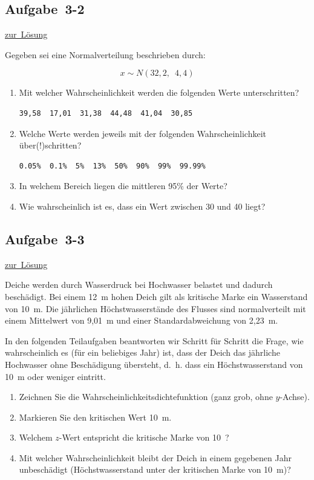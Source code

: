 \documentclass[
  11pt,
  ngerman,
  a4paper,
]{report}
\providecommand{\tightlist}{%
  \setlength{\itemsep}{0pt}\setlength{\parskip}{0pt}}
\begin{document}
\hypertarget{aufgabe-3-2}{%
\subsection{Aufgabe~3-2}\label{aufgabe-3-2}}

\protect\hyperlink{loesung-3-2}{zur~Lösung}

Gegeben sei eine Normalverteilung beschrieben durch:

\[x \sim N(32{,}2,\enspace4{,}4)\]

\begin{enumerate}
\def\labelenumi{\alph{enumi})}
\item
  Mit welcher Wahrscheinlichkeit werden die folgenden Werte unterschritten?

\begin{verbatim}
39,58  17,01  31,38  44,48  41,04  30,85
\end{verbatim}
\item
  Welche Werte werden jeweils mit der folgenden Wahrscheinlichkeit über(!)schritten?

\begin{verbatim}
0.05%  0.1%  5%  13%  50%  90%  99%  99.99%
\end{verbatim}
\item
  In welchem Bereich liegen die mittleren 95\% der Werte?
\item
  Wie wahrscheinlich ist es, dass ein Wert zwischen 30 und 40 liegt?
\end{enumerate}

\hypertarget{aufgabe-3-3}{%
\subsection{Aufgabe~3-3}\label{aufgabe-3-3}}

\protect\hyperlink{loesung-3-3}{zur~Lösung}

Deiche werden durch Wasserdruck bei Hochwasser belastet und dadurch beschädigt. Bei einem 12~m hohen Deich gilt als kritische Marke ein Wasserstand von 10~m. Die jährlichen Höchstwasserstände des Flusses sind normalverteilt mit einem Mittelwert von 9,01~m und einer Standardabweichung von 2,23~m.

In den folgenden Teilaufgaben beantworten wir Schritt für Schritt die Frage, wie wahrscheinlich es (für ein beliebiges Jahr) ist, dass der Deich das jährliche Hochwasser ohne Beschädigung übersteht, d.~h. dass ein Höchstwasserstand von 10~m oder weniger eintritt.

\begin{enumerate}
\def\labelenumi{\alph{enumi})}
\tightlist
\item
  Zeichnen Sie die Wahrscheinlichkeitsdichtefunktion (ganz grob, ohne \(y\)-Achse).
\item
  Markieren Sie den kritischen Wert 10~m.
\item
  Welchem \(z\)-Wert entspricht die kritische Marke von 10~?
\item
  Mit welcher Wahrscheinlichkeit bleibt der Deich in einem gegebenen Jahr unbeschädigt (Höchstwasserstand unter der kritischen Marke von 10~m)?
\end{enumerate}
\end{document}
